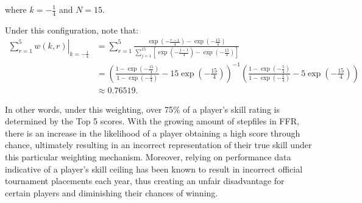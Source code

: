 

where $k = - \frac{1}{4}$ and $N = 15$.

\vspace{2mm}

Under this configuration, note that:
\begin{align*}
	 \left. \sum_{r = 1}^5 w(k, r) \right|_{k = - \frac{1}{4}} & = \displaystyle \sum_{r = 1}^5 \frac{\exp\left(\displaystyle -\frac{r-1}{4}\right) - \exp\left(\displaystyle -\frac{15}{4}\right)}{\displaystyle\sum_{j = 1}^{15} \left[\exp\left(\displaystyle-\frac{j-1}{4}\right) - \exp\left(\displaystyle-\frac{15}{4}\right)\right]}\\
  &= \displaystyle \left( \displaystyle \frac{1 - \exp\left(\displaystyle-\frac{15}{4}\right)}{1 - \exp\left(\displaystyle-\frac{1}{4}\right)} - 15 \exp\left(\displaystyle-\frac{15}{4}\right) \right)^{-1}\left( \displaystyle \frac{1 - \exp\left(\displaystyle-\frac{5}{4}\right)}{1 - \exp\left(\displaystyle-\frac{1}{4}\right)} - 5 \exp\left(\displaystyle-\frac{15}{4}\right) \right)\\
  &\approx 0.76519.
\end{align*}

In other words, under this weighting, over 75\% of a player's skill rating is determined by the Top 5 scores. With the growing amount of stepfiles in FFR, there is an increase in the likelihood of a player obtaining a high score through chance, ultimately resulting in an incorrect representation of their true skill under this particular weighting mechanism. Moreover, relying on performance data indicative of a player's skill ceiling has been known to result in incorrect official tournament placements each year, thus creating an unfair disadvantage for certain players and diminishing their chances of winning.


